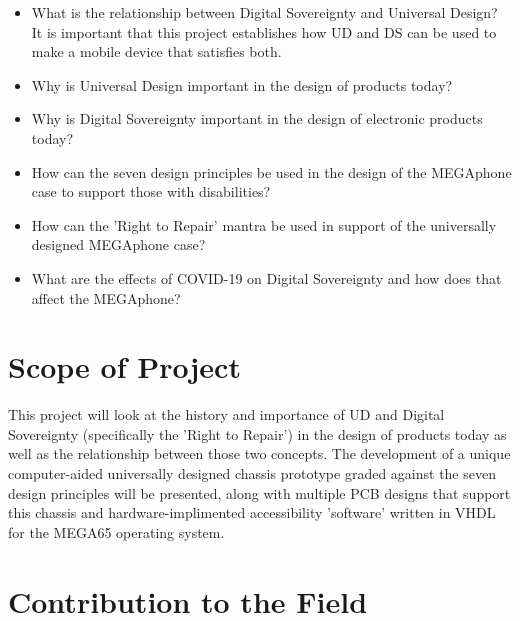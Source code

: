 \begin{itemize}
    \item What is the relationship between Digital Sovereignty and Universal Design? %
    It is important that this project establishes how UD and DS can be used to make a mobile device that satisfies both.
    \item Why is Universal Design important in the design of products today?
    \item Why is Digital Sovereignty important in the design of electronic products today?
    \item How can the seven design principles be used in the design of the MEGAphone case to support those with disabilities?
    \item How can the 'Right to Repair' mantra be used in support of the universally designed MEGAphone case?
    \item What are the effects of COVID-19 on Digital Sovereignty and how does that affect the MEGAphone? %
\end{itemize}

\section{Scope of Project}

This project will look at the history and importance of UD and Digital Sovereignty (specifically the 'Right to Repair') in the design of products today as well as the relationship between those two concepts.
The development of a unique computer-aided universally designed chassis prototype graded against the seven design principles \cite{sevenprinciples} will be presented, along with multiple PCB designs that support this chassis and hardware-implimented accessibility 'software' written in VHDL for the MEGA65 operating system.

\section{Contribution to the Field} %

